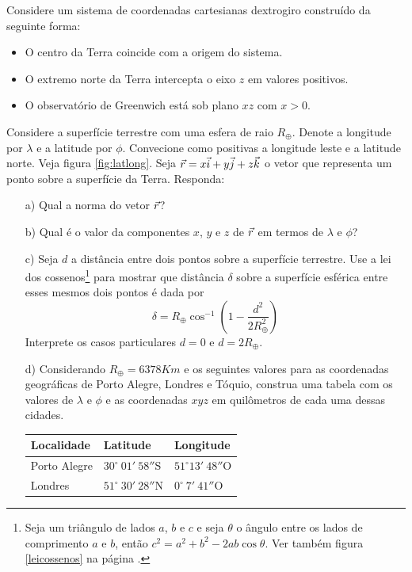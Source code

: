 \begin{exer} 
Considere um sistema de coordenadas cartesianas dextrogiro construído da seguinte forma:

\begin{itemize}
\item O centro da Terra coincide com a origem do sistema.
\item O extremo norte da Terra intercepta o eixo $z$ em valores positivos.
\item O observatório de Greenwich está sob plano $xz$ com $x>0$.
\end{itemize}
Considere a superfície terrestre com uma esfera de raio $R_{\oplus}$. Denote a longitude por $\lambda$ e a latitude por $\phi$. Convecione como positivas a longitude leste  e a latitude norte. Veja figura \ref{fig:latlong}. Seja $\vec{r}=x\vec{i}+y\vec{j}+z\vec{k}$ o vetor que representa um ponto sobre a superfície da Terra. Responda:
\begin{itemize}
\item[a)] Qual a norma do vetor $\vec{r}$?
\item[b)] Qual é o valor da componentes $x$, $y$ e $z$ de $\vec{r}$ em termos de $\lambda$ e $\phi$? 
\item[c)] Seja $d$ a distância entre dois pontos sobre a superfície terrestre. Use a lei dos cossenos\footnote{Seja um triângulo de lados $a$, $b$ e $c$ e seja $\theta$ o ângulo entre os lados de comprimento $a$ e $b$, então $c^2=a^2+b^2-2ab\cos\theta.$ Ver também figura \ref{leicossenos} na página \pageref{leicossenos}.} para mostrar que distância $\delta$ sobre a superfície esférica entre esses mesmos dois pontos é dada por
$$\delta=R_\oplus \cos^{-1}\left(1-\frac{d^2}{2R_\oplus^2}\right)$$
Interprete os casos particulares $d=0$ e $d=2R_\oplus$. 
\item[d)] Considerando $R_\oplus=6378Km$ e os seguintes valores para as coordenadas geográficas de Porto Alegre, Londres e Tóquio, construa uma tabela com os valores de $\lambda$ e $\phi$ e as coordenadas $xyz$ em quilômetros de cada uma dessas cidades.
\begin{table}[h]
	\centering
		\begin{tabular}{|l|l|l|}
		\hline
	  Localidade & Latitude & Longitude\\ 
		\hline
		Porto Alegre & $30^\circ~ 01{'}~58{''}$S & $51^\circ  13{'}~48{''}$O\\ 		
  	\hline
		Londres & $51^\circ~ 30{'}~28{''}$N & $0^\circ~ 7{'}~41{''}$O\\ 		

\end{tabular}
\end{table}
\end{itemize}
\end{exer}
